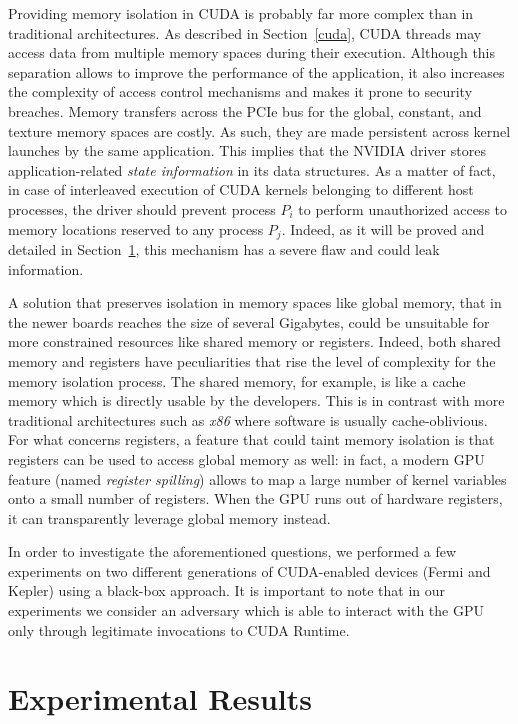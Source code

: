 \documentclass[11pt,onecolumn,letterpaper]{IEEEtran}
\begin{document}
Providing memory isolation in CUDA is probably far more complex than in traditional architectures.
As described in Section~\ref{cuda}, CUDA threads may access data from multiple memory spaces during their execution.
Although this separation allows to improve the performance of the application,
it also increases the complexity of access control mechanisms and makes it prone to security breaches.
Memory transfers across the PCIe bus for the global, constant, and texture memory spaces are costly.
As such, they are made persistent across kernel launches by the same application.
This implies that the NVIDIA driver stores application-related \emph{state information} in its data structures.
As a matter of fact, in case of interleaved execution of CUDA kernels belonging to different host processes,
the driver should prevent process $P_i$ to perform unauthorized access to memory locations reserved to any process $P_j$.
Indeed, as it will be proved and detailed in Section~\ref{experimental}, this mechanism has a severe flaw and could leak information.

A solution that preserves isolation in memory spaces like global memory,
that in the newer boards reaches the size of several Gigabytes, 
could be unsuitable for more constrained resources like shared memory or registers.
Indeed, both shared memory and registers have peculiarities that rise the level of complexity for the memory isolation process.
The shared memory, for example, is like a cache memory which is directly usable by the developers. 
This is in contrast with more traditional architectures such as \emph{x86} where software is usually cache-oblivious.
For what concerns registers, a feature that could taint memory isolation is that registers can be used to access global memory as well:
in fact, a modern GPU feature (named \emph{register spilling}) allows to map a large number of kernel variables onto a small number of registers.
When the GPU runs out of hardware registers, it can transparently leverage global memory instead.

In order to investigate the aforementioned questions, we performed a few experiments on two different
generations of CUDA-enabled devices (Fermi and Kepler) using a black-box approach.
It is important to note that in our experiments we consider an adversary which is able to interact
with the GPU only through legitimate invocations to CUDA Runtime.

\section{Experimental Results}
\label{experimental}
\end{document}
